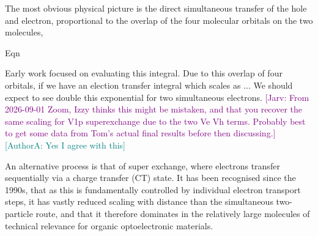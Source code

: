 \documentclass[aps,physrev,reprint,superscriptaddress,nofootinbib,amsmath,amssymb,a4paper]{revtex4-2}
\newcommand{\jarv}[1]{\textcolor{purple}{[Jarv: #1]}}
\newcommand{\izzy}[1]{\textcolor{teal}{[AuthorA: #1]}}
\begin{document}
The most obvious physical picture is the direct simultaneous transfer of the hole and electron, proportional to the overlap of the four molecular orbitals on the two molecules, 

Eqn


Early work focused on evaluating this integral. Due to this overlap of four orbitals, if we have an election transfer integral which scales as ... We should expect to see double this exponential for two simultaneous electrons. \jarv{From 2026-09-01 Zoom, Izzy thinks this might be mistaken, and that you recover the same scaling for V1p superexchange due to the two Ve Vh terms. Probably best to get some data from Tom's actual final results before then discussing.}
\izzy{Yes I agree with this}

An alternative process is that of super exchange, where electrons transfer sequentially via a charge transfer (CT) state. It has been recognised since the 1990s, that as this is fundamentally controlled by individual electron transport steps, it has vastly reduced scaling with distance than the simultaneous two-particle route, and that it therefore dominates in the relatively large molecules of technical relevance for organic optoelectronic materials. 
\end{document}
